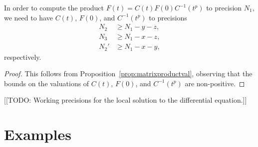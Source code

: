 \begin{cor}
In order to compute the product $F(t) = C(t) F(0) C^{-1}(t^p)$ to 
precision $N_1$, we need to have $C(t)$, $F(0)$, and $C^{-1}(t^p)$ 
to precisions 
\begin{align*}
N_2  & \geq N_1 - y - z, \\
N_3  & \geq N_1 - x - z, \\
N_2' & \geq N_1 - x - y,
\end{align*}
respectively.
\end{cor}

\begin{proof}
This follows from Proposition~\ref{prop:matrixproductval}, observing 
that the bounds on the valuations of $C(t)$, $F(0)$, and $C^{-1}(t^p)$ 
are non-positive.
\end{proof}

[[TODO:  Working precisions for the local solution to the differential equation.]]


\chapter{Examples}

